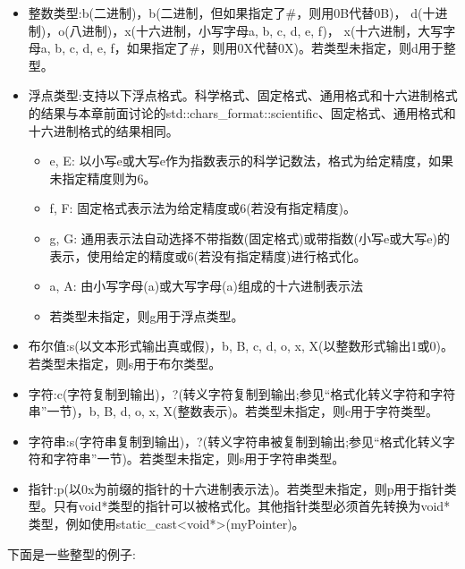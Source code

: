 \begin{itemize}
\item
整数类型:b(二进制)，b(二进制，但如果指定了\#，则用0B代替0B)， d(十进制)，o(八进制)，x(十六进制，小写字母a, b, c, d, e, f)， x(十六进制，大写字母a, b, c, d, e, f，如果指定了\#，则用0X代替0X)。若类型未指定，则d用于整型。

\item
浮点类型:支持以下浮点格式。科学格式、固定格式、通用格式和十六进制格式的结果与本章前面讨论的std::chars\_format::scientific、固定格式、通用格式和十六进制格式的结果相同。

\begin{itemize}
\item
e, E: 以小写e或大写e作为指数表示的科学记数法，格式为给定精度，如果未指定精度则为6。

\item
f, F: 固定格式表示法为给定精度或6(若没有指定精度)。

\item
g, G: 通用表示法自动选择不带指数(固定格式)或带指数(小写e或大写e)的表示，使用给定的精度或6(若没有指定精度)进行格式化。

\item
a, A: 由小写字母(a)或大写字母(a)组成的十六进制表示法

\item
若类型未指定，则g用于浮点类型。
\end{itemize}

\item
布尔值:s(以文本形式输出真或假)，b, B, c, d, o, x, X(以整数形式输出1或0)。若类型未指定，则s用于布尔类型。

\item
字符:c(字符复制到输出)，?(转义字符复制到输出;参见“格式化转义字符和字符串”一节)，b, B, d, o, x, X(整数表示)。若类型未指定，则c用于字符类型。

\item
字符串:s(字符串复制到输出)，?(转义字符串被复制到输出;参见“格式化转义字符和字符串”一节)。若类型未指定，则s用于字符串类型。

\item
指针:p(以0x为前缀的指针的十六进制表示法)。若类型未指定，则p用于指针类型。只有void*类型的指针可以被格式化。其他指针类型必须首先转换为void*类型，例如使用static\_cast<void*>(myPointer)。
\end{itemize}

下面是一些整型的例子:


